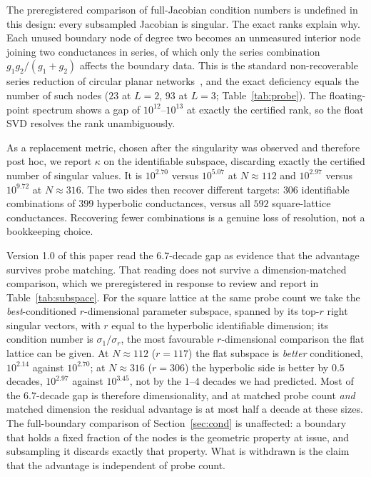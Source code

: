 \documentclass[11pt,a4paper]{article}
\begin{document}
The preregistered comparison of full-Jacobian condition numbers is undefined in this design: every subsampled
Jacobian is singular. The exact ranks explain why. Each unused boundary node of degree two becomes an unmeasured
interior node joining two conductances in series, of which only the series combination $g_1g_2/(g_1+g_2)$ affects
the boundary data. This is the standard non-recoverable series reduction of circular planar
networks~\cite{CurtisMorrow2000}, and the exact deficiency equals the number of such nodes ($23$ at $L=2$, $93$ at
$L=3$; Table~\ref{tab:probe}). The floating-point spectrum shows a gap of $10^{12}$--$10^{13}$ at exactly the
certified rank, so the float SVD resolves the rank unambiguously.

As a replacement metric, chosen after the singularity was observed and therefore post hoc, we report $\kappa$ on
the identifiable subspace, discarding exactly the certified number of singular values. It is $10^{2.70}$ versus
$10^{5.07}$ at $N\approx112$ and $10^{2.97}$ versus $10^{9.72}$ at $N\approx316$. The two sides then recover
different targets: $306$ identifiable combinations of $399$ hyperbolic conductances, versus all $592$ square-lattice
conductances. Recovering fewer combinations is a genuine loss of resolution, not a bookkeeping choice.

Version 1.0 of this paper read the $6.7$-decade gap as evidence that the advantage survives probe matching. That
reading does not survive a dimension-matched comparison, which we preregistered in response to review and report in
Table~\ref{tab:subspace}. For the square lattice at the same probe count we take the \emph{best}-conditioned
$r$-dimensional parameter subspace, spanned by its top-$r$ right singular vectors, with $r$ equal to the hyperbolic
identifiable dimension; its condition number is $\sigma_1/\sigma_r$, the most favourable $r$-dimensional
comparison the flat lattice can be given. At $N\approx112$ ($r=117$) the flat subspace is \emph{better} conditioned,
$10^{2.14}$ against $10^{2.70}$; at $N\approx316$ ($r=306$) the hyperbolic side is better by $0.5$ decades,
$10^{2.97}$ against $10^{3.45}$, not by the $1$--$4$ decades we had predicted. Most of the $6.7$-decade gap is
therefore dimensionality, and at matched probe count \emph{and} matched dimension the residual advantage is at most
half a decade at these sizes. The full-boundary comparison of Section~\ref{sec:cond} is unaffected: a boundary that
holds a fixed fraction of the nodes is the geometric property at issue, and subsampling it discards exactly that
property. What is withdrawn is the claim that the advantage is independent of probe count.
\end{document}
